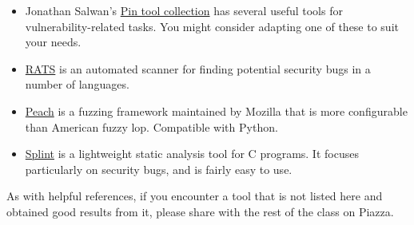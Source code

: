 \documentclass[11pt]{article}
\begin{document}
\begin{itemize}
\item Jonathan Salwan's \href{https://github.com/JonathanSalwan/PinTools}{Pin tool collection} has several useful tools for vulnerability-related tasks. You might consider adapting one of these to suit your needs.

\item \href{https://www.debian.org/security/audit/examples/RATS}{RATS} is an automated scanner for finding potential security bugs in a number of languages.

\item \href{https://github.com/MozillaSecurity/peach}{Peach} is a fuzzing framework maintained by Mozilla that is more configurable than American fuzzy lop. Compatible with Python.

\item \href{http://www.splint.org/}{Splint} is a lightweight static analysis tool for C programs. It focuses particularly on security bugs, and is fairly easy to use.
\end{itemize}
As with helpful references, if you encounter a tool that is not listed here and obtained good results from it, please share with the rest of the class on Piazza.
\end{document}
